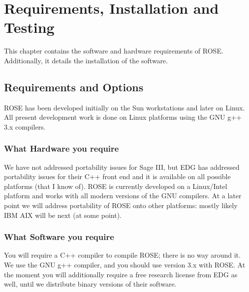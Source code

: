 
\chapter{ Requirements, Installation and Testing }
\label{Requirements_Installation_Testing}


   This chapter contains the software and hardware requirements of ROSE.
Additionally, it details the installation of the software.

\section{Requirements and Options}
   ROSE has been developed initially on the Sun workstations and later on Linux.
All present development work is done on Linux platforms using the GNU g++ 3.x 
compilers.

\subsection{What Hardware you require}
   We have not addressed portability issues for Sage III, but EDG has addressed 
portability issues for their C++ front end and it is available on all possible 
platforms (that I know of).  ROSE is currently developed on a Linux/Intel platform
and works with all modern versions of the GNU compilers. At a later point we will 
address portability of ROSE onto other platforms: mostly likely IBM AIX will be 
next (at some point).

\subsection{What Software you require}
   You will require a C++ compiler to compile ROSE; there is no way around it.
We use the GNU g++ compiler, and you should use version 3.x with ROSE.
At the moment you will additionally require a free research license from 
EDG as well, until we distribute binary versions of their software.

